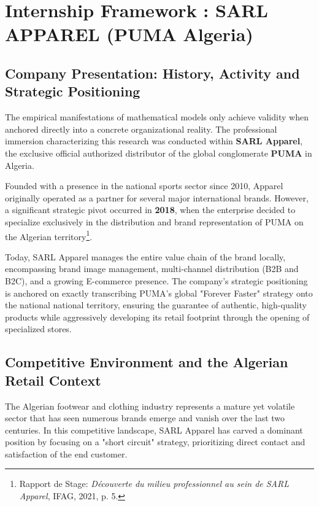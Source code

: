 \documentclass[12pt,a4paper]{report}
\begin{document}
\setcounter{chapter}{1} %
\setcounter{section}{2} %

\section{Internship Framework : SARL APPAREL (PUMA Algeria)}

\subsection{Company Presentation: History, Activity and Strategic Positioning}
The empirical manifestations of mathematical models only achieve validity when anchored directly into a concrete organizational reality. The professional immersion characterizing this research was conducted within \textbf{SARL Apparel}, the exclusive official authorized distributor of the global conglomerate \textbf{PUMA} in Algeria. 

Founded with a presence in the national sports sector since 2010, Apparel originally operated as a partner for several major international brands. However, a significant strategic pivot occurred in \textbf{2018}, when the enterprise decided to specialize exclusively in the distribution and brand representation of PUMA on the Algerian territory\footnote{Rapport de Stage: \textit{Découverte du milieu professionnel au sein de SARL Apparel}, IFAG, 2021, p. 5.}. 

Today, SARL Apparel manages the entire value chain of the brand locally, encompassing brand image management, multi-channel distribution (B2B and B2C), and a growing E-commerce presence. The company's strategic positioning is anchored on exactly transcribing PUMA's global "Forever Faster" strategy onto the national national territory, ensuring the guarantee of authentic, high-quality products while aggressively developing its retail footprint through the opening of specialized stores.

\subsection{Competitive Environment and the Algerian Retail Context}
The Algerian footwear and clothing industry represents a mature yet volatile sector that has seen numerous brands emerge and vanish over the last two centuries. In this competitive landscape, SARL Apparel has carved a dominant position by focusing on a "short circuit" strategy, prioritizing direct contact and satisfaction of the end customer.
\end{document}
